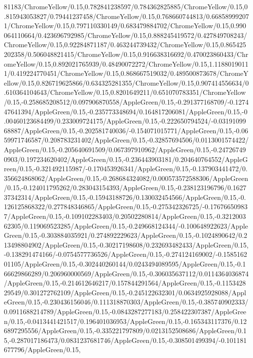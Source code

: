 {\begin{tikzternal}
{81183/ChromeYellow/0.15,0.782841238597/0.784362825885/ChromeYellow/0.15,0.815943053827/0.79441237458/ChromeYellow/0.15,0.768660744813/0.668589992071/ChromeYellow/0.15,0.797110330149/0.683479884702/ChromeYellow/0.15,0.990064110664/0.423696792985/ChromeYellow/0.15,0.888245419572/0.427849708243/ChromeYellow/0.15,0.92284871187/0.463244739432/ChromeYellow/0.15,0.865425202358/0.506048821415/ChromeYellow/0.15,0.916638316692/0.470023860433/ChromeYellow/0.15,0.892021765939/0.48490072272/ChromeYellow/0.15,1.11880190111/0.419224770451/ChromeYellow/0.15,0.868667519032/0.489500873678/ChromeYellow/0.15,0.826719625866/0.634325281355/ChromeYellow/0.15,0.907414556634/0.610364104643/ChromeYellow/0.15,0.8201649211/0.651070783351/ChromeYellow/0.15,-0.258685208512/0.097906870558/AppleGreen/0.15,-0.291377168709/-0.127447641394/AppleGreen/0.15,-0.235773348694/0.164817206081/AppleGreen/0.15,-0.00460123684499/0.233009724175/AppleGreen/0.15,-0.222650794524/-0.0319109968887/AppleGreen/0.15,-0.202581740036/-0.154071015771/AppleGreen/0.15,-0.0659971746587/0.208783231402/AppleGreen/0.15,-0.32857694506/0.0113001574422/AppleGreen/0.15,-0.205640691509/0.067397910962/AppleGreen/0.15,-0.247267490903/0.197234620402/AppleGreen/0.15,-0.236443903181/0.204640764552/AppleGreen/0.15,-0.321492115987/-0.170453926341/AppleGreen/0.15,-0.137903441472/0.356624868062/AppleGreen/0.15,-0.268684324082/0.000573572588306/AppleGreen/0.15,-0.124011795262/0.283043154393/AppleGreen/0.15,-0.238123196796/0.162737342314/AppleGreen/0.15,-0.15943188726/0.130032454566/AppleGreen/0.15,-0.126125868322/0.277848346865/AppleGreen/0.15,-0.275342326725/-0.176766509837/AppleGreen/0.15,-0.109102283403/0.20502280814/AppleGreen/0.15,-0.321200362305/0.119069523285/AppleGreen/0.15,-0.249668124344/-0.100648922623/AppleGreen/0.15,-0.303884035921/0.274892229623/AppleGreen/0.15,-0.1024890642/0.213498804902/AppleGreen/0.15,-0.30217198608/0.232693482433/AppleGreen/0.15,-0.138291474166/-0.0754577736526/AppleGreen/0.15,-0.274124169002/-0.158516201105/AppleGreen/0.15,-0.302440260144/0.0243494089595/AppleGreen/0.15,-0.166629866289/0.206960000569/AppleGreen/0.15,-0.306035637112/0.0114364036874/AppleGreen/0.15,-0.214612646217/0.157844291564/AppleGreen/0.15,-0.115342829549/0.301272762109/AppleGreen/0.15,-0.245122632301/0.0634925928088/AppleGreen/0.15,-0.230436156046/0.111318870303/AppleGreen/0.15,-0.385740902333/0.0911688214789/AppleGreen/0.15,-0.0843287277183/0.258422307387/AppleGreen/0.15,-0.0413441421517/0.196401036953/AppleGreen/0.15,-0.165343117376/0.126897295556/AppleGreen/0.15,-0.335221797809/0.0213152508686/AppleGreen/0.15,-0.287017186473/0.0831237681746/AppleGreen/0.15,-0.308501499394/-0.101181677796/AppleGreen/0.15,
}
\end{tikzternal}}
